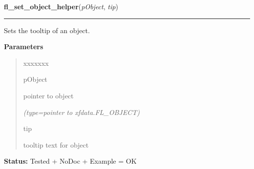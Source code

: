 \hspace{.8\funcindent}\begin{boxedminipage}{\funcwidth}

    \raggedright \textbf{fl\_set\_object\_helper}(\textit{pObject}, \textit{tip})

    \vspace{-1.5ex}

    \rule{\textwidth}{0.5\fboxrule}
\setlength{\parskip}{2ex}
    Sets the tooltip of an object.

\setlength{\parskip}{1ex}
      \textbf{Parameters}
      \vspace{-1ex}

      \begin{quote}
        \begin{Ventry}{xxxxxxx}

          \item[pObject]

          pointer to object

            {\it (type=pointer to xfdata.FL\_OBJECT)}

          \item[tip]

          tooltip text for object

        \end{Ventry}

      \end{quote}

\textbf{Status:} Tested + NoDoc + Example = OK



    \end{boxedminipage}

    \label{xformslib:library:fl_set_object_position}

    \vspace{0.5ex}

